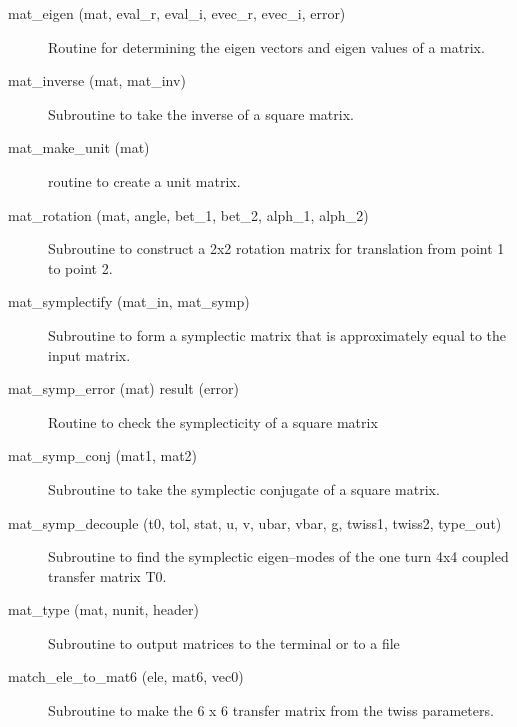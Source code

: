 \begin{description}
\label{r:mat.eigen}
\item[mat_eigen (mat, eval_r, eval_i, evec_r, evec_i, error)] \Newline 
Routine for determining the eigen vectors and eigen values of a matrix.

\label{r:mat.inverse}
\item[mat_inverse (mat, mat_inv)] \Newline
Subroutine to take the inverse of a square matrix. 

\label{r:mat.make.unit}
\item[mat_make_unit (mat)] \Newline 
     routine to create a unit matrix.

\label{r:mat.rotation}
\item[mat_rotation (mat, angle, bet_1, bet_2, alph_1, alph_2)] \Newline 
     Subroutine to construct a 2x2 rotation matrix for translation from
     point 1 to point 2.

\label{r:mat.symplectify}
\item[mat_symplectify (mat_in, mat_symp)] \Newline
Subroutine to form a symplectic matrix that is approximately equal to the input matrix. 

\label{r:mat.symp.error}
\item[mat_symp_error (mat) result (error)] \Newline
Routine to check the symplecticity of a square matrix 

\label{r:mat.symp.conj}
\item[mat_symp_conj (mat1, mat2)] \Newline 
Subroutine to take the symplectic conjugate of a square matrix.

\label{r:mat.symp.decouple}
\item[mat_symp_decouple (t0, tol, stat, u, v, ubar, vbar, g, twiss1, twiss2, type_out)] \Newline
Subroutine to find the symplectic eigen--modes of the one turn 4x4 coupled 
transfer matrix T0. 

\label{r:mat.type}
\item[mat_type (mat, nunit, header)] \Newline 
     Subroutine to output matrices to the terminal or to a file

\label{r:match.ele.to.mat6}
\item[match_ele_to_mat6 (ele, mat6, vec0)] \Newline 
Subroutine to make the 6 x 6 transfer matrix from the twiss parameters.


\end{description}
